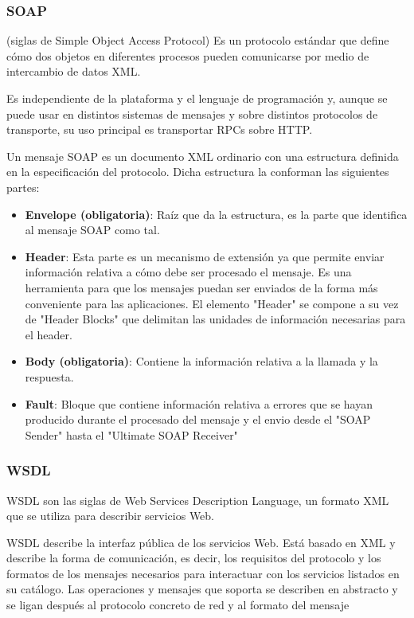 \subsubsection{SOAP}
\begin{defn}[SOAP]
(siglas de Simple Object Access Protocol) Es un protocolo estándar que define cómo dos objetos en diferentes procesos pueden comunicarse por medio de intercambio de datos XML.

Es independiente de la plataforma y el lenguaje de programación y, aunque se puede usar en distintos sistemas de mensajes y sobre distintos protocolos de transporte, su uso principal es transportar RPCs sobre HTTP.
\end{defn}

Un mensaje SOAP es un documento XML ordinario con una estructura definida en la especificación del protocolo. Dicha estructura la conforman las siguientes partes:
\begin{itemize}
\item \textbf{Envelope (obligatoria)}: Raíz que da la estructura, es la parte que identifica al mensaje SOAP como tal.
\item \textbf{Header}: Esta parte es un mecanismo de extensión ya que permite enviar información relativa a cómo debe ser procesado el mensaje. Es una herramienta para que los mensajes puedan ser enviados de la forma más conveniente para las aplicaciones. El elemento "Header" se compone a su vez de "Header Blocks" que delimitan las unidades de información necesarias para el header.
\item \textbf{Body (obligatoria)}: Contiene la información relativa a la llamada y la respuesta.
\item \textbf{Fault}: Bloque que contiene información relativa a errores que se hayan producido durante el procesado del mensaje y el envio desde el "SOAP Sender" hasta el "Ultimate SOAP Receiver"
\end{itemize}

\subsubsection{WSDL}
\begin{defn}[WSDL]
WSDL son las siglas de Web Services Description Language, un formato XML que se utiliza para describir servicios Web.

WSDL describe la interfaz pública de los servicios Web. Está basado en XML y describe la forma de comunicación, es decir, los requisitos del protocolo y los formatos de los mensajes necesarios para interactuar con los servicios listados en su catálogo. Las operaciones y mensajes que soporta se describen en abstracto y se ligan después al protocolo concreto de red y al formato del mensaje
\end{defn}

